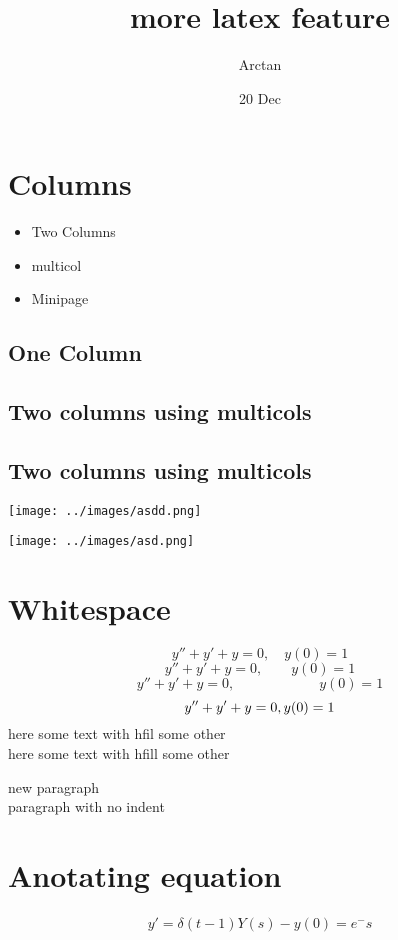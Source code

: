 \documentclass{article}
\title{more latex feature}
\author{Arctan}
\date{20 Dec}
\begin{document}
\maketitle

\section{Columns}
\begin{itemize}
    \item Two Columns
    \item multicol
    \item Minipage
\end{itemize}

\newpage
\onecolumn
\subsection{One Column}
\lipsum[1-2]

\newpage
\subsection{Two columns using multicols}
\begin{multicols}{2}
    \lipsum[1-3]
\end{multicols}

\newpage

\subsection{Two columns using multicols}
\begin{multicols*}{2}
    
    \lipsum[1-3]
\end{multicols*}

\newpage
\begin{minipage}{0.6\textwidth}
    \texttt{[image: ../images/asdd.png]}
\end{minipage}
\hspace{10pt}
\begin{minipage}{0.3\textwidth}
    \texttt{[image: ../images/asd.png]}
\end{minipage}

\newpage
\section{Whitespace}

\[y''+ y'+y=0,\quad y(0)=1\]
\[y'' + y'+y=0, \qquad y(0)=1 \]
\[y'' + y'+y=0, \hspace{1in} y(0)=1 \]
\[y'' + y'+y=0, \hfill y(0)=1 \]
here some text with hfil \hfil some other \\
here some text with hfill \hfill some other

new paragraph\\

\noindent paragraph with no indent
\vfill
\lipsum[1]

\newpage

\section{Anotating equation}
\begin{align}
    y'=\delta(t-1)
    Y(s)-y(0) = e^-s
\end{align}
\end{document}
